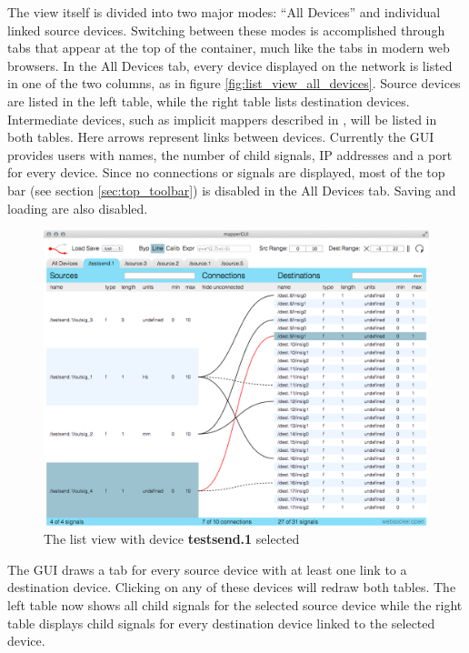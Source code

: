 The view itself is divided into two major modes: ``All Devices'' and individual linked source devices. Switching between these modes is accomplished through tabs that appear at the top of the container, much like the tabs in modern web browsers. In the All Devices tab, every device displayed on the network is listed in one of the two columns, as in figure \ref{fig:list_view_all_devices}. Source devices are listed in the left table, while the right table lists destination devices. Intermediate devices, such as implicit mappers described in \cite{interpolated_mappings}, will be listed in both tables. Here arrows represent links between devices. Currently the GUI provides users with names, the number of child signals, IP addresses and a port for every device. Since no connections or signals are displayed, most of the top bar (see section \ref{sec:top_toolbar}) is disabled in the All Devices tab. Saving and loading are also disabled.

\begin{figure}[ht]
\centering
	\includegraphics[width=1\textwidth]{figures/list_view_single_link}
\caption{The list view with device \textbf{testsend.1} selected}
\label{fig:list_view_single_link}
\end{figure}

The GUI draws a tab for every source device with at least one link to a destination device. Clicking on any of these devices will redraw both tables. The left table now shows all child signals for the selected source device while the right table displays child signals for every destination device linked to the selected device. 

